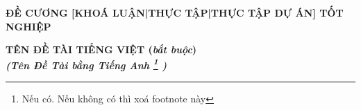 \documentclass{article}[14pt]
\begin{document}
\begin{figure}[h]
	\begin{floatrow}
		{%

		}
		{%

		}
	\end{floatrow}
\end{figure}

\begin{center}

	\textbf{\Large ĐỀ CƯƠNG [KHOÁ LUẬN|THỰC TẬP|THỰC TẬP DỰ ÁN] TỐT NGHIỆP} \\
\end{center}


\begin{center}

	\textbf{\huge TÊN ĐỀ TÀI TIẾNG VIỆT (\textit{bắt buộc})}
	\\

	\vspace{.5cm}
	\textit{\textbf{\Large (Tên Đề Tài bằng Tiếng Anh \footnote{Nếu có. Nếu không có thì xoá footnote này} )}}
\end{center}

\vspace{.5cm}
\end{document}
